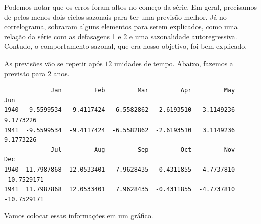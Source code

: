 \documentclass[
  letterpaper,
  DIV=11,
  numbers=noendperiod]{scrreprt}
\newenvironment{Shaded}{\begin{snugshade}}{\end{snugshade}}
\newcommand{\DecValTok}[1]{\textcolor[rgb]{0.68,0.00,0.00}{#1}}
\newcommand{\FunctionTok}[1]{\textcolor[rgb]{0.28,0.35,0.67}{#1}}
\newcommand{\NormalTok}[1]{\textcolor[rgb]{0.00,0.23,0.31}{#1}}
\newcommand{\OtherTok}[1]{\textcolor[rgb]{0.00,0.23,0.31}{#1}}
\newcommand{\SpecialCharTok}[1]{\textcolor[rgb]{0.37,0.37,0.37}{#1}}
\begin{document}
Podemos notar que os erros foram altos no começo da série. Em geral,
precisamos de pelos menos dois ciclos sazonais para ter uma previsão
melhor. Já no correlograma, sobraram alguns elementos para serem
explicados, como uma relação da série com as defasagens 1 e 2 e uma
sazonalidade autoregressiva. Contudo, o comportamento sazonal, que era
nosso objetivo, foi bem explicado.

As previsões vão se repetir após \(12\) unidades de tempo. Abaixo,
fazemos a previsão para 2 anos.

\begin{Shaded}
\end{Shaded}

\begin{verbatim}
             Jan         Feb         Mar         Apr         May         Jun
1940  -9.5599534  -9.4117424  -6.5582862  -2.6193510   3.1149236   9.1773226
1941  -9.5599534  -9.4117424  -6.5582862  -2.6193510   3.1149236   9.1773226
             Jul         Aug         Sep         Oct         Nov         Dec
1940  11.7987868  12.0533401   7.9628435  -0.4311855  -4.7737810 -10.7529171
1941  11.7987868  12.0533401   7.9628435  -0.4311855  -4.7737810 -10.7529171
\end{verbatim}

Vamos colocar essas informações em um gráfico.
\end{document}
